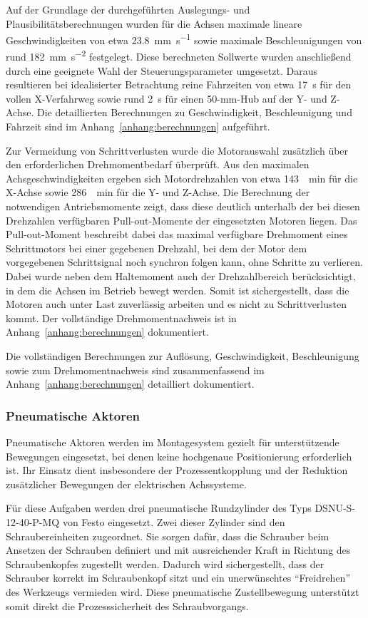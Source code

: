 Auf der Grundlage der durchgeführten Auslegungs- und Plausibilitätsberechnungen wurden für die Achsen maximale lineare Geschwindigkeiten von etwa \qty{23,8}{\mm\per\s} sowie maximale Beschleunigungen von rund \qty{182}{\mm\per\s\tothe{2}} festgelegt. Diese berechneten Sollwerte wurden anschließend durch eine geeignete Wahl der Steuerungsparameter umgesetzt. Daraus resultieren bei idealisierter Betrachtung reine Fahrzeiten von etwa \qty{17}{\second} für den vollen X-Verfahrweg sowie rund \qty{2}{\second} für einen 50-mm-Hub auf der Y- und Z-Achse. Die detaillierten Berechnungen zu Geschwindigkeit, Beschleunigung und Fahrzeit sind im Anhang~\ref{anhang:berechnungen} aufgeführt.

Zur Vermeidung von Schrittverlusten wurde die Motorauswahl zusätzlich über den erforderlichen Drehmomentbedarf überprüft. Aus den maximalen Achsgeschwindigkeiten ergeben sich Motordrehzahlen von etwa \qty{143}{\per\minute} für die X-Achse sowie \qty{286}{\per\minute} für die Y- und Z-Achse. Die Berechnung der notwendigen Antriebsmomente zeigt, dass diese deutlich unterhalb der bei diesen Drehzahlen verfügbaren Pull-out-Momente der eingesetzten Motoren liegen. Das Pull-out-Moment beschreibt dabei das maximal verfügbare Drehmoment eines Schrittmotors bei einer gegebenen Drehzahl, bei dem der Motor dem vorgegebenen Schrittsignal noch synchron folgen kann, ohne Schritte zu verlieren. Dabei wurde neben dem Haltemoment auch der Drehzahlbereich berücksichtigt, in dem die Achsen im Betrieb bewegt werden. Somit ist sichergestellt, dass die Motoren auch unter Last zuverlässig arbeiten und es nicht zu Schrittverlusten kommt. Der vollständige Drehmomentnachweis ist in Anhang~\ref{anhang:berechnungen} dokumentiert.

Die vollständigen Berechnungen zur Auflösung, Geschwindigkeit, Beschleunigung sowie zum Drehmomentnachweis sind zusammenfassend im Anhang~\ref{anhang:berechnungen} detailliert dokumentiert.


\subsubsection{Pneumatische Aktoren}
Pneumatische Aktoren werden im Montagesystem gezielt für unterstützende Bewegungen eingesetzt, bei denen keine hochgenaue Positionierung erforderlich ist. Ihr Einsatz dient insbesondere der Prozessentkopplung und der Reduktion zusätzlicher Bewegungen der elektrischen Achssysteme.

Für diese Aufgaben werden drei pneumatische Rundzylinder des Typs DSNU-S-12-40-P-MQ von Festo eingesetzt. Zwei dieser Zylinder sind den Schraubereinheiten zugeordnet. Sie sorgen dafür, dass die Schrauber beim Ansetzen der Schrauben definiert und mit ausreichender Kraft in Richtung des Schraubenkopfes zugestellt werden. Dadurch wird sichergestellt, dass der Schrauber korrekt im Schraubenkopf sitzt und ein unerwünschtes \enquote{Freidrehen} des Werkzeugs vermieden wird. Diese pneumatische Zustellbewegung unterstützt somit direkt die Prozesssicherheit des Schraubvorgangs.\cite{ds_festo_dsnu}

